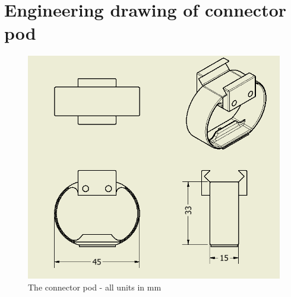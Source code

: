 \section{Engineering drawing of connector pod}
\label{sec:app3}
\begin{figure}[H]
	\centering
	\includegraphics[width=1.1\textwidth, angle=270]{imgs/app3_connectorpod_drawing}
	\caption{The connector pod - all units in \si{\milli\meter}}
	\label{fig:app3}
\end{figure}